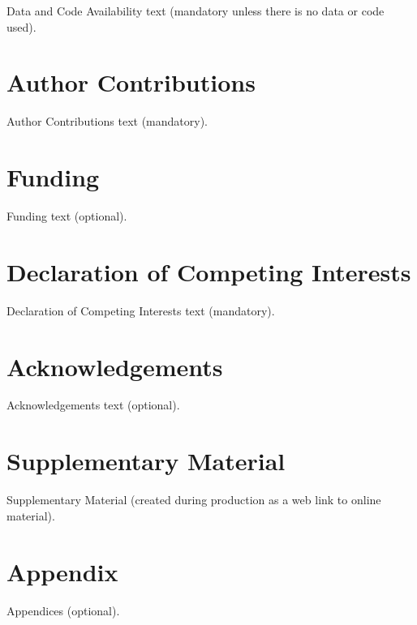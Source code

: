 \documentclass[]{imag-ms-template}
\begin{document}
Data and Code Availability text (mandatory unless there is no data or code used).

\section*{Author Contributions}

Author Contributions text (mandatory).

\section*{Funding}

Funding text (optional).

\section*{Declaration of Competing Interests}

Declaration of Competing Interests text (mandatory).

\section*{Acknowledgements}

Acknowledgements text (optional).

\section*{Supplementary Material}

Supplementary Material (created during production as a web link to online material).

\printbibliography

\appendix

\section{Appendix}

Appendices (optional).
\end{document}

